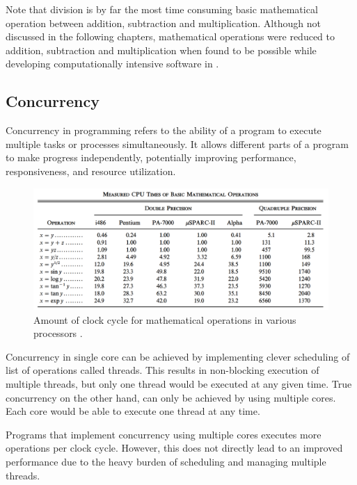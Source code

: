 \documentclass{article}
\begin{document}
Note that division is by far the most time consuming basic mathematical operation between addition, subtraction and multiplication.
Although not discussed in the following chapters, mathematical operations were reduced to addition, subtraction and multiplication when found to be possible while developing computationally intensive software in .
\subsection{Concurrency}

Concurrency in programming refers to the ability of a program to execute multiple tasks or processes simultaneously. It allows different parts of a program to make progress independently, potentially improving performance, responsiveness, and resource utilization.

\vspace{18pt}
\begin{figure}[H]
    \centering
    \includegraphics[width=.95\textwidth]{../../../figures/cpu_instruction_speed.png}
    \vspace{-3pt}
    \caption{Amount of clock cycle for mathematical operations in various processors \cite{cpu_instruction_speed}.}
\end{figure}

\vspace{-5pt}
Concurrency in single core can be achieved by implementing clever scheduling of list of operations called threads. This results in non-blocking execution of multiple threads, but only one thread would be executed at any given time. 
True concurrency on the other hand, can only be achieved by using multiple cores. Each core would be able to execute one thread at any time.

Programs that implement concurrency using multiple cores executes more operations per clock cycle. 
However, this does not directly lead to an improved performance due to the heavy burden of scheduling and managing multiple threads.
\end{document}
